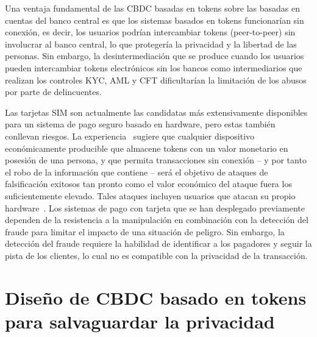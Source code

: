 \documentclass[a4paper,10pt]{article} %
\begin{document}
Una ventaja fundamental de las CBDC basadas en tokens sobre las basadas
en cuentas del banco central es que los sistemas basados en tokens
funcionarían sin conexión, es decir, los usuarios podrían intercambiar
tokens (peer-to-peer) sin involucrar al banco central, lo que protegería
la privacidad y la libertad de las personas. Sin embargo, la
desintermediación que se produce cuando los usuarios pueden intercambiar
tokens electrónicos sin los bancos como intermediarios que realizan los
controles KYC, AML y CFT dificultarían la limitación de los abusos por
parte de delincuentes.

Las tarjetas SIM son actualmente las candidatas más extensivamente
disponibles para un sistema de pago seguro basado en hardware, pero
estas también conllevan riesgos. La experiencia~\cite[véase p. ej.][]{Soukup,Garcia,Kasper,CCC} sugiere
que cualquier dispositivo económicamente producible que almacene tokens
con un valor monetario en posesión de una persona, y que permita
transacciones sin conexión -- y por tanto el robo de la información que
contiene -- será el objetivo de ataques de falsificación exitosos tan
pronto como el valor económico del ataque fuera los suficientemente
elevado. Tales ataques incluyen usuarios que atacan su propio
hardware~\cite[véase también]{Allen}. Los sistemas de pago con tarjeta que
se han desplegado previamente dependen de la resistencia a la
manipulación en combinación con la detección del fraude para limitar el
impacto de una situación de peligro. Sin embargo, la detección del
fraude requiere la habilidad de identificar a los pagadores y seguir la
pista de los clientes, lo cual no es compatible con la privacidad de la
transacción.

\section{Diseño de CBDC basado en tokens para salvaguardar la
privacidad}
\label{4.-diseuxf1o-de-cbdc-basado-en-tokens-para-salvaguardar-la-privacidad}
\end{document}
